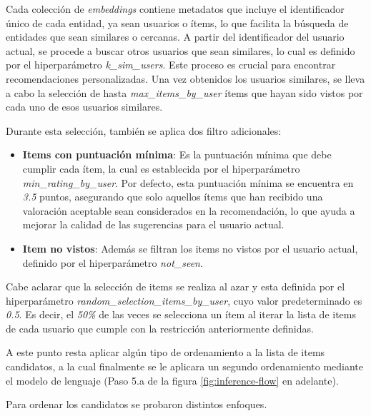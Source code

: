 \documentclass[11pt,a4paper,twoside]{thesis}
\begin{document}
Cada colección de \textit{embeddings} contiene metadatos que incluye el identificador único de cada entidad, ya sean usuarios o ítems, lo que facilita la búsqueda de entidades que sean similares o cercanas. A partir del identificador del usuario actual, se procede a buscar otros usuarios que sean similares, lo cual es definido por el hiperparámetro \textit{k\_sim\_users}. Este proceso es crucial para encontrar recomendaciones personalizadas. Una vez obtenidos los usuarios similares, se lleva a cabo la selección de hasta \textit{max\_items\_by\_user} ítems que hayan sido vistos por cada uno de esos usuarios similares.

Durante esta selección, también se aplica dos filtro adicionales:

\begin{itemize}
	\item \textbf{Items con puntuación mínima}: Es la puntuación mínima que debe cumplir cada ítem, la cual es establecida por el hiperparámetro \textit{min\_rating\_by\_user}. Por defecto, esta puntuación mínima se encuentra en \textit{3.5} puntos, asegurando que solo aquellos ítems que han recibido una valoración aceptable sean considerados en la recomendación, lo que ayuda a mejorar la calidad de las sugerencias para el usuario actual.
	\item \textbf{Item no vistos}: Además se filtran los items no vistos por el usuario actual, definido por el hiperparámetro \textit{not\_seen}.
\end{itemize}

Cabe aclarar que la selección de items se realiza al azar y esta definida por el hiperparámetro \textit{random\_selection\_items\_by\_user}, cuyo valor predeterminado es \textit{0.5}. Es decir, el \textit{50\%} de las veces se selecciona un ítem al iterar la lista de items de cada usuario que cumple con la restricción anteriormente definidas.

A este punto resta aplicar algún tipo de ordenamiento a la lista de items candidatos, a la cual finalmente se le aplicara un segundo ordenamiento mediante el modelo de lenguaje (Paso 5.a de la figura \ref{fig:inference-flow} en adelante).

Para ordenar los candidatos se probaron distintos enfoques.
\end{document}
